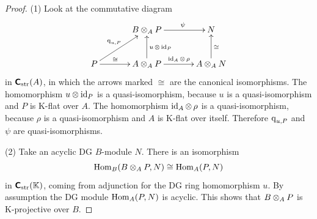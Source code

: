 \begin{proof} \mbox{}

\smallskip \noindent
(1) Look at the commutative diagram 
\[ \UseTips \xymatrix @C=8ex @R=6ex {
&
B \ot_A P 
\ar[r]^(0.56){\psi}
&
N
\\
P
\ar[r]^(0.4){\cong}
\ar[ur]^{\opn{q}_{u, P}}
&
A \ot_A P
\ar[u]_{u \, \ot \, \opn{id}_P}
\ar[r]^{\opn{id}_A \ot \, \rho}
&
A \ot_A N 
\ar[u]_{\cong}
} \]
in $\boldsymbol{\mathsf{C}}_{\mathrm{str}}(A)$, in which the arrows marked $\cong$ are the 
canonical isomorphisms. 
The homomorphism $u \otimes \operatorname{id}_P$ is a quasi-isomorphism, because $u$ is a 
quasi-isomorphism and $P$ is K-flat over $A$. 
The homomorphism $\operatorname{id}_A \otimes \, \rho$ is a quasi-isomorphism, because 
$\rho$ is a quasi-isomorphism and $A$ is K-flat over itself. Therefore
$\operatorname{q}_{u, P}$ and $\psi$ are quasi-isomorphisms.

\medskip \noindent 
(2) Take an acyclic DG $B$-module $N$. There is an isomorphism 
\[ \operatorname{Hom}_B(B \otimes_A P, N) \cong \operatorname{Hom}_A(P, N) \]
in $\boldsymbol{\mathsf{C}}_{\mathrm{str}}(\mathbb{K})$, coming from adjunction for the DG ring 
homomorphism $u$. By assumption the DG module $\operatorname{Hom}_A(P, N)$ is acyclic. 
This shows that $B \otimes_A P$ is K-projective over $B$. 
\end{proof}

